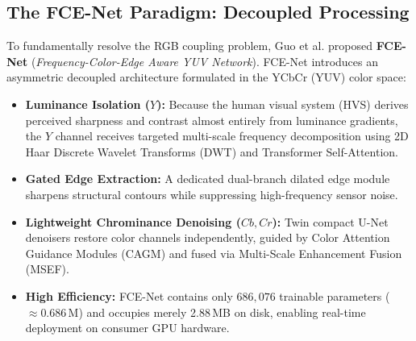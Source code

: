 \documentclass[10pt,twocolumn,letterpaper]{article}
\begin{document}
\subsection{The FCE-Net Paradigm: Decoupled Processing}
To fundamentally resolve the RGB coupling problem, Guo et al. \cite{guo2026fcenet} proposed \textbf{FCE-Net} (\textit{Frequency-Color-Edge Aware YUV Network}). FCE-Net introduces an asymmetric decoupled architecture formulated in the YCbCr (YUV) color space:
\begin{itemize}
    \item \textbf{Luminance Isolation ($Y$):} Because the human visual system (HVS) derives perceived sharpness and contrast almost entirely from luminance gradients, the $Y$ channel receives targeted multi-scale frequency decomposition using 2D Haar Discrete Wavelet Transforms (DWT) and Transformer Self-Attention.
    \item \textbf{Gated Edge Extraction:} A dedicated dual-branch dilated edge module sharpens structural contours while suppressing high-frequency sensor noise.
    \item \textbf{Lightweight Chrominance Denoising ($Cb, Cr$):} Twin compact U-Net denoisers restore color channels independently, guided by Color Attention Guidance Modules (CAGM) and fused via Multi-Scale Enhancement Fusion (MSEF).
    \item \textbf{High Efficiency:} FCE-Net contains only $686,076$ trainable parameters ($\approx 0.686$\,M) and occupies merely 2.88\,MB on disk, enabling real-time deployment on consumer GPU hardware.
\end{itemize}
\end{document}
